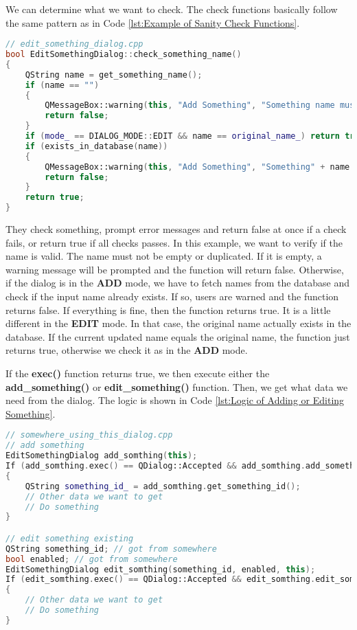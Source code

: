 We can determine what we want to check. The check functions basically follow the same pattern as in Code \ref{lst:Example of Sanity Check Functions}.
\begin{lstlisting}[language=C++, caption={Example of Sanity Check Functions\label{lst:Example of Sanity Check Functions}}]
// edit_something_dialog.cpp
bool EditSomethingDialog::check_something_name()
{
    QString name = get_something_name();
    if (name == "")
    {
        QMessageBox::warning(this, "Add Something", "Something name must not be empty!");
        return false;
    }
    if (mode_ == DIALOG_MODE::EDIT && name == original_name_) return true;
    if (exists_in_database(name))
    {
        QMessageBox::warning(this, "Add Something", "Something" + name + "already exists!")
        return false;
    }
    return true;
} 
\end{lstlisting}
They check something, prompt error messages and return false at once if a check fails, or return true if all checks passes. In this example, we want to verify if the name is valid. The name must not be empty or duplicated. If it is empty, a warning message will be prompted and the function will return false. Otherwise, if the dialog is in the \textbf{ADD} mode, we have to fetch names from the database and check if the input name already exists. If so, users are warned and the function returns false. If everything is fine, then the function returns true. It is a little different in the \textbf{EDIT} mode. In that case, the original name actually exists in the database. If the current updated name equals the original name, the function just returns true, otherwise we check it as in the \textbf{ADD} mode.

If the \textbf{exec()} function returns true, we then execute either the \textbf{add\_something()} or \textbf{edit\_something()} function. Then, we get what data we need from the dialog. The logic is shown in Code \ref{lst:Logic of Adding or Editing Something}.

\begin{lstlisting}[language=C++, caption={Logic of Adding or Editing Something\label{lst:Logic of Adding or Editing Something}}]
// somewhere_using_this_dialog.cpp
// add something
EditSomethingDialog add_somthing(this);
If (add_somthing.exec() == QDialog::Accepted && add_somthing.add_something())
{
    QString something_id_ = add_somthing.get_something_id();
    // Other data we want to get
    // Do something
}

// edit something existing
QString something_id; // got from somewhere
bool enabled; // got from somewhere
EditSomethingDialog edit_somthing(something_id, enabled, this);
If (edit_somthing.exec() == QDialog::Accepted && edit_somthing.edit_something())
{
    // Other data we want to get
    // Do something
} 
\end{lstlisting}


